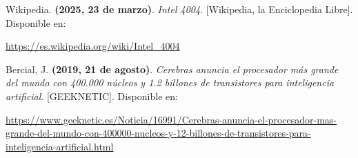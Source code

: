 \documentclass[12pt,letterpaper]{article}
\begin{document}
\begin{thebibliography}{9}
  Wikipedia. \textbf{(2025, 23 de marzo)}. \textit{Intel 4004}. [Wikipedia, la Enciclopedia Libre]. Disponible en:

  \url{https://es.wikipedia.org/wiki/Intel_4004}

  Bercial, J. \textbf{(2019, 21 de agosto)}. \textit{Cerebras anuncia el procesador más grande del mundo con 400.000 núcleos y 1.2 billones de transistores para inteligencia artificial}. [GEEKNETIC]. Disponible en:

  \url{https://www.geeknetic.es/Noticia/16991/Cerebras-anuncia-el-procesador-mas-grande-del-mundo-con-400000-nucleos-y-12-billones-de-transistores-para-inteligencia-artificial.html}

\end{thebibliography}
    
\end{document}
